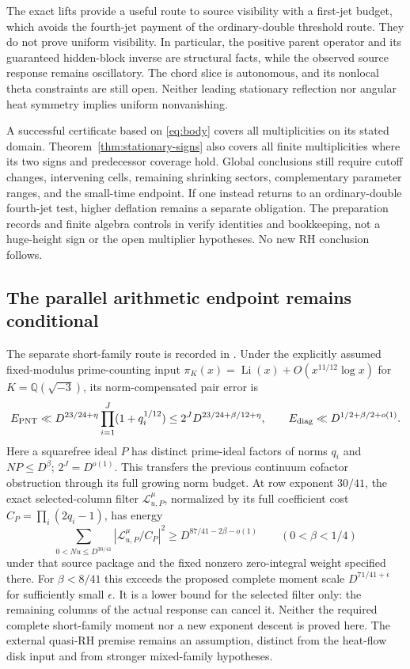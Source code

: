 \documentclass[11pt]{article}
\theoremstyle{definition}
\theoremstyle{remark}
\begin{document}
The exact lifts provide a useful route to source visibility with a
first-jet budget, which avoids the fourth-jet payment of the ordinary-double
threshold route. They do not prove uniform visibility. In particular, the positive
parent operator and its guaranteed hidden-block inverse are structural
facts, while the observed source response remains oscillatory. The chord
slice is autonomous, and its nonlocal theta constraints are still open.
Neither leading stationary reflection nor angular heat symmetry implies
uniform nonvanishing.

A successful certificate based on \eqref{eq:body} covers all multiplicities
on its stated domain. Theorem~\ref{thm:stationary-signs} also covers all
finite multiplicities where its two signs and predecessor coverage hold.
Global conclusions still require cutoff changes,
intervening cells, remaining shrinking sectors, complementary parameter
ranges, and the small-time endpoint. If one instead returns to an
ordinary-double fourth-jet test, higher deflation remains a separate
obligation. The preparation records and finite algebra controls in
\cite{heat25} verify identities and bookkeeping, not a huge-height sign
or the open multiplier hypotheses. No new RH conclusion follows.


\subsection{The parallel arithmetic endpoint remains conditional}

The separate short-family route is recorded in \cite{arithmeticcontinuation}.
Under the explicitly assumed fixed-modulus prime-counting input
$\pi_K(x)=\operatorname{Li}(x)+O(x^{11/12}\log x)$ for
$K=\mathbb Q(\sqrt{-3})$, its norm-compensated pair error is
\[
 E_{\rm PNT}\ll D^{23/24+\eta}\prod_{i=1}^J(1+q_i^{1/12})
 \le 2^J D^{23/24+\beta/12+\eta},\qquad
 E_{\rm diag}\ll D^{1/2+\beta/2+o(1)}.
\]
Here a squarefree ideal $P$ has distinct prime-ideal factors of norms
$q_i$ and $NP\le D^\beta$; $2^J=D^{o(1)}$. This transfers the
previous continuum cofactor obstruction through its full growing norm
budget. At row exponent $30/41$, the exact selected-column filter
$\mathcal L^\mu_{u,P}$, normalized by its full coefficient cost
$C_P=\prod_i(2q_i-1)$, has energy
\[
 \sum_{0<Nu\le D^{30/41}}
 |\mathcal L^\mu_{u,P}/C_P|^2
 \ge D^{87/41-2\beta-o(1)}\qquad(0<\beta<1/4)
\]
under that source package and the fixed nonzero zero-integral weight
specified there. For $\beta<8/41$ this exceeds the proposed complete
moment scale $D^{71/41+\epsilon}$ for sufficiently small $\epsilon$.
It is a lower bound for the selected filter only: the remaining columns
of the actual response can cancel it. Neither the required complete
short-family moment nor a new exponent descent is proved here. The
external quasi-RH premise remains an assumption, distinct from the
heat-flow disk input and from stronger mixed-family hypotheses.
\end{document}
